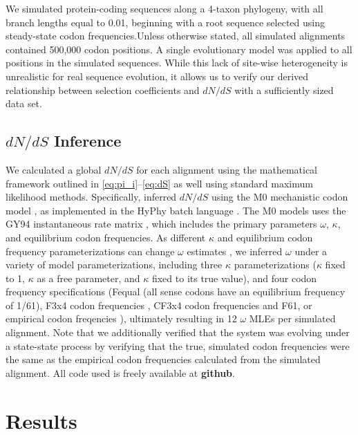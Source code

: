 \documentclass[11pt]{article}
\begin{document}
We simulated protein-coding sequences along a 4-taxon phylogeny, with all branch lengths equal to 0.01, beginning with a root sequence selected using steady-state codon frequencies.Unless otherwise stated, all simulated alignments contained 500,000 codon positions. A single evolutionary model was applied to all positions in the simulated sequences. While this lack of site-wise heterogeneity is unrealistic for real sequence evolution, it allows us to verify our derived relationship between selection coefficients and $dN/dS$ with a sufficiently sized data set.



\subsection*{$dN/dS$ Inference}
We calculated a global $dN/dS$ for each alignment using the mathematical framework outlined in \eqref{eq:pi_i}--\eqref{eq:dS} as well using standard maximum likelihood methods. Specifically, inferred $dN/dS$ using the M0 mechanistic codon model \cite{Yangetal2000}, as implemented in the HyPhy batch language \cite{KosakovskyPondetal2005}. The M0 models uses the GY94 instantaneous rate matrix \cite{GoldmanYang1994,NielsenYang1998}, which includes the primary parameters $\omega$, $\kappa$, and equilibrium codon frequencies. As different $\kappa$ and equilibrium codon frequency parameterizations can change $\omega$ estimates \cite{YN00, Yang2006, ZhangYu2006}, we inferred $\omega$ under a variety of model parameterizations, including three $\kappa$ parameterizations ($\kappa$ fixed to 1, $\kappa$ as a free parameter, and $\kappa$ fixed to its true value), and four codon frequency specifications (Fequal (all sense codons have an equilibrium frequency of 1/61),  F3x4 codon frequencies \cite{MuseGaut1994}, CF3x4 codon frequencies \cite{Pond2010} and F61, or empirical codon freqencies \cite{GoldmanYang1994}), ultimately resulting in 12 $\omega$ MLEs per simulated alignment. Note that we additionally verified that the system was evolving under a state-state process by verifying that the true, simulated codon frequencies were the same as the empirical codon frequencies calculated from the simulated alignment. All code used is freely available at \textbf{github}. 



\section*{Results}
\end{document}
